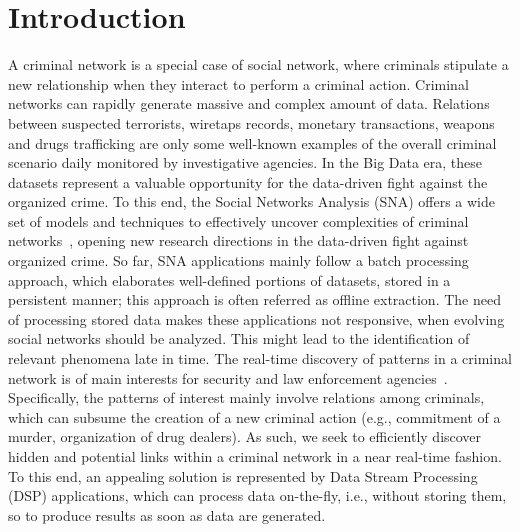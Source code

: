 \section{Introduction}
\label{sec:introduction}
%
%
A criminal network is a special case of social network, where criminals stipulate a new relationship when they interact to perform a criminal action. 
%
Criminal networks can rapidly generate massive and complex amount of data.
%
Relations between suspected terrorists, wiretaps records, monetary transactions, weapons and drugs trafficking are only some well-known examples of the overall criminal scenario daily monitored by investigative agencies.
%
In the Big Data era, these datasets represent a valuable opportunity for the data-driven fight against the organized crime.
%
%
To this end, the Social Networks Analysis (SNA) offers a wide set of models and techniques to effectively uncover complexities of criminal networks~\cite{berlusconi2017social}, opening new research directions in the data-driven fight against organized crime.
%
%
%
So far, SNA applications mainly follow a batch processing approach, which elaborates well-defined portions of datasets, stored in a persistent manner; this approach is often referred as offline extraction.
%
%
The need of processing stored data makes these applications not responsive, when evolving social networks should be analyzed. This might lead to the identification of relevant phenomena late in time. 
%
The real-time discovery of patterns in a criminal network is of main interests for security and law enforcement agencies~\cite{berlusconi2016link}. 
Specifically, the patterns of interest mainly involve relations among criminals, which can subsume the creation of a new criminal action (e.g., commitment of a murder, organization of drug dealers). As such, we seek to efficiently discover hidden and potential links within a criminal network in a near real-time fashion.
%
To this end, an appealing solution is represented by Data Stream Processing (DSP) applications, which can process data on-the-fly, i.e., without storing them, so to produce results as soon as data are generated. 

